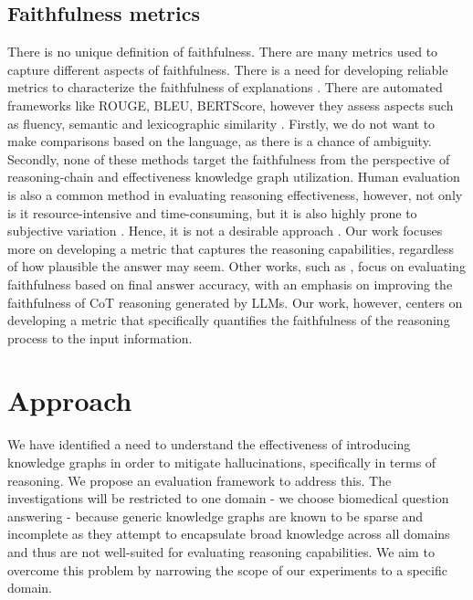 \documentclass[11pt,a4paper]{article}
\begin{document}
\subsection{Faithfulness metrics} 
There is no unique definition of faithfulness. There are many metrics used to capture different aspects of faithfulness. There is a need for developing reliable metrics to characterize the faithfulness of explanations \cite{agarwal2024faithfulnessvsplausibilityunreliability}.
There are automated frameworks like ROUGE, BLEU, BERTScore, however they assess aspects such as fluency, semantic and lexicographic similarity \cite{malin2024review}. Firstly, we do not want to make comparisons based on the language, as there is a chance of ambiguity. Secondly, none of these methods target the faithfulness from the perspective of reasoning-chain and effectiveness knowledge graph utilization. Human evaluation is also a common method in evaluating reasoning effectiveness, however, not only is it resource-intensive and time-consuming, but it is also highly prone to subjective variation \cite{malin2024review}. Hence, it is not a desirable approach \cite{jacovi2020towards}. Our work focuses more on developing a metric that captures the reasoning capabilities, regardless of how plausible the answer may seem. Other works, such as \cite{lyu2023faithfulchainofthoughtreasoning}, focus on evaluating faithfulness based on final answer accuracy, with an emphasis on improving the faithfulness of CoT reasoning generated by LLMs. Our work, however, centers on developing a metric that specifically quantifies the faithfulness of the reasoning process to the input information.



\section{Approach}
We have identified a need to understand the effectiveness of introducing knowledge graphs in order to mitigate hallucinations, specifically in terms of reasoning. We propose an evaluation framework to address this. The investigations will be restricted to one domain - we choose biomedical question answering - because generic knowledge graphs are known to be sparse and incomplete as they attempt to encapsulate broad knowledge across all domains \cite{demir2023litcqdmultihopreasoningincomplete, waagmeester2020wikidata} and thus are not well-suited for evaluating reasoning capabilities. We aim to overcome this problem by narrowing the scope of our experiments to a specific domain.
\end{document}
